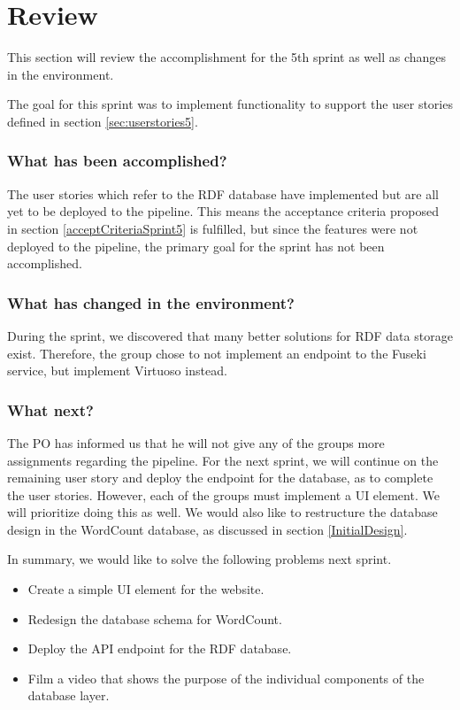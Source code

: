 \section{Review}
This section will review the accomplishment for the 5th sprint as well as changes in the \knox{} environment. 

The goal for this sprint was to implement functionality to support the user stories defined in section \ref{sec:userstories5}. 

\subsubsection*{What has been accomplished?}
The user stories which refer to the RDF database have implemented but are all yet to be deployed to the \knox{} pipeline. This means the acceptance criteria proposed in section \ref{acceptCriteriaSprint5} is fulfilled, but since the features were not deployed to the pipeline, the primary goal for the sprint has not been accomplished. 

\subsubsection*{What has changed in the environment?}
During the sprint, we discovered that many better solutions for RDF data storage exist. Therefore, the group chose to not implement an endpoint to the Fuseki service, but implement Virtuoso instead. 

\subsubsection*{What next?}
The PO has informed us that he will not give any of the \knox{} groups more assignments regarding the pipeline. 
For the next sprint, we will continue on the remaining user story and deploy the endpoint for the database, as to complete the user stories. 
However, each of the \knox{} groups must implement a UI element. We will prioritize doing this as well.
We would also like to restructure the database design in the WordCount database, as discussed in section \ref{InitialDesign}.


In summary, we would like to solve the following problems next sprint.

\begin{itemize}
    \item Create a simple UI element for the \knox{} website.
    \item Redesign the database schema for WordCount.
    \item Deploy the API endpoint for the RDF database.
    \item Film a video that shows the purpose of the individual components of the database layer.
\end{itemize}
